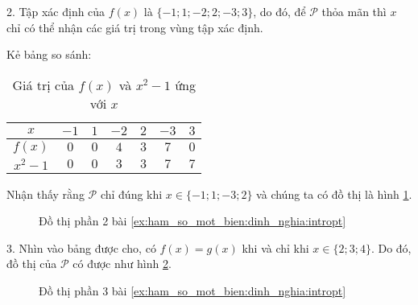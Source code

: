 {
   \begin{minipageindent}{0.48\textwidth}
      2. Tập xác định của $f(x)$ là $\{-1; 1; -2; 2; -3; 3\}$, do đó, để $\mathcal{P}$ thỏa mãn thì $x$ chỉ có thể nhận các giá trị trong vùng tập xác định.

      Kẻ bảng so sánh:
      \begin{table}[H]
         \centering
         \begin{tabular}{|c|c|c|c|c|c|c|}
            \hline
            $x$ & $-1$ & $1$ & $-2$ & $2$ & $-3$ & $3$\\
            \hline
            $f(x)$ & $0$ & $0$ & $4$ & $3$ & $7$ & $0$\\
            \hline
            $x^2-1$ & $0$ & $0$ & $3$ & $3$ & $7$ & $7$\\
            \hline
         \end{tabular}
         \caption{Giá trị của $f(x)$ và $x^2-1$ ứng với $x$}
         \label{tab:ham_so_mot_bien:dinh_nghia:values3}
      \end{table}

      Nhận thấy rằng $\mathcal{P}$ chỉ đúng khi $x\in \{-1; 1; -3; 2\}$ và chúng ta có đồ thị là hình \ref{fig:ham_so_mot_bien:dinh_nghia:dtp2}.
   \end{minipageindent}
   \hfill
   \begin{minipageindent}{0.48\textwidth}
      \begin{figure}[H]
         \centering
         \caption{Đồ thị phần 2 bài \ref{ex:ham_so_mot_bien:dinh_nghia:intropt}}
         \label{fig:ham_so_mot_bien:dinh_nghia:dtp2}
      \end{figure}
   \end{minipageindent}
}

{
   \begin{minipageindent}{0.48\textwidth}
      3. Nhìn vào bảng được cho, có $f(x) = g(x)$ khi và chỉ khi $x\in \{2; 3; 4\}$. Do đó, đồ thị của $\mathcal{P}$ có được như hình \ref{fig:ham_so_mot_bien:dinh_nghia:dtp3}.
   \end{minipageindent}
   \hfill
   \begin{minipageindent}{0.48\textwidth}
      \begin{figure}[H]
         \centering
         \caption{Đồ thị phần 3 bài \ref{ex:ham_so_mot_bien:dinh_nghia:intropt}}
         \label{fig:ham_so_mot_bien:dinh_nghia:dtp3}
      \end{figure}
   \end{minipageindent}
}

